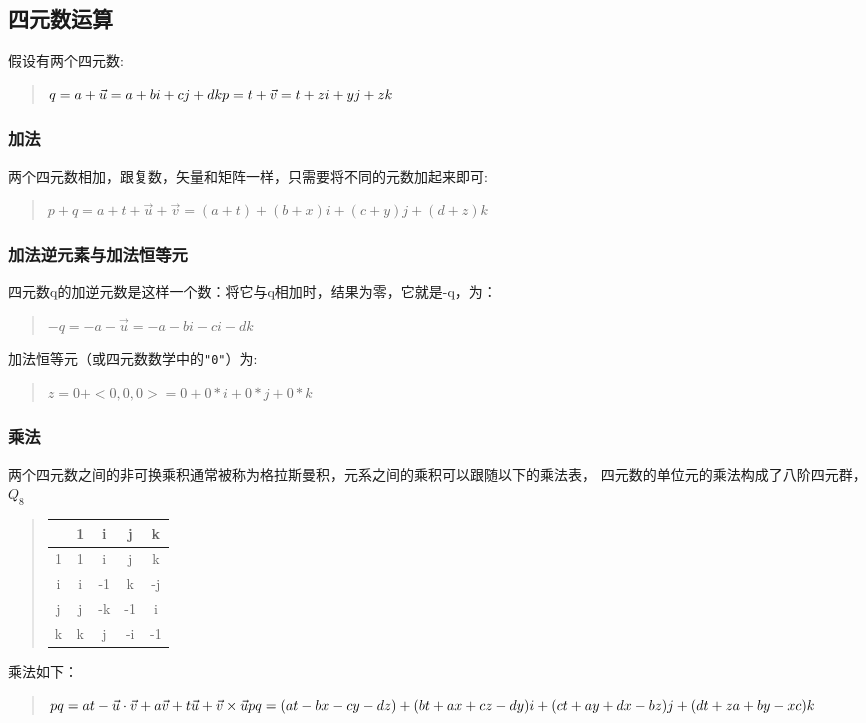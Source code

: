 \documentclass[a4paper,10pt]{article}
\begin{document}
\begin{CJK}{UTF8}{song}
\subsection{四元数运算}
假设有两个四元数:
\begin{quote}
\begin{math}
q=a+\vec{u}=a+bi+cj+dk \\
p=t+\vec{v}=t+zi+yj+zk
\end{math}
\end{quote}
\subsubsection{加法}
两个四元数相加，跟复数，矢量和矩阵一样，只需要将不同的元数加起来即可:
\begin{quote}
\begin{math}
p+q=a+t+\vec{u}+\vec{v}=(a+t)+(b+x)i+(c+y)j+(d+z)k
\end{math}
\end{quote}
\subsubsection{加法逆元素与加法恒等元}
四元数q的加逆元数是这样一个数：将它与q相加时，结果为零，它就是-q，为：
\begin{quote}
$-q=-a-\vec{u}=-a-bi-ci-dk $
\end{quote}
加法恒等元（或四元数数学中的\verb|"0"|）为:
\begin{quote}
$z=0+<0,0,0>=0+0*i+0*j+0*k $
\end{quote}
\subsubsection{乘法}
两个四元数之间的非可换乘积通常被称为格拉斯曼积，元系之间的乘积可以跟随以下的乘法表， 四元数的单位元的乘法构成了八阶四元群，$Q_{8}$
\begin{quote}
\begin{tabular}{c|c|c|c|c}
 & 1 & i & j & k \\ 
\hline 
1 & 1 & i & j & k \\
\hline 
i & i & -1 & k & -j \\
\hline 
j & j & -k & -1 & i \\
\hline 
k & k & j & -i & -1 \\
\end{tabular}
\end{quote}
乘法如下：
\begin{quote}
\begin{math}
pq=at-\vec{u}\cdot\vec{v}+a\vec{v}+t\vec{u}+\vec{v}\times\vec{u} \\
pq=(at-bx-cy-dz)+(bt+ax+cz-dy)i+(ct+ay+dx-bz)j+(dt+za+by-xc)k
\end{math}
\end{quote}

\end{CJK}
\end{document}
